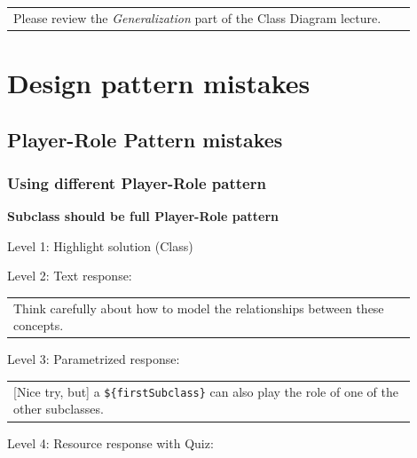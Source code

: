 \begin{tabular}{|p{0.9\linewidth}}
Please review the \textit{Generalization} part of the Class Diagram lecture.
\end{tabular} \medskip




\section{Design pattern mistakes}

\subsection{Player-Role Pattern mistakes}

\subsubsection{Using different Player-Role pattern}

\noindent \textbf{Subclass should be full Player-Role pattern} \medskip

\noindent Level 1: Highlight solution (Class) \medskip

\noindent Level 2: Text response: \medskip

\begin{tabular}{|p{0.9\linewidth}}
Think carefully about how to model the relationships between these concepts.
\end{tabular} \medskip

\noindent Level 3: Parametrized response: \medskip

\begin{tabular}{|p{0.9\linewidth}}
[Nice try, but] a \verb|${firstSubclass}| can also play the role of one of the other subclasses.
\end{tabular} \medskip

\noindent Level 4: Resource response with Quiz: \medskip


